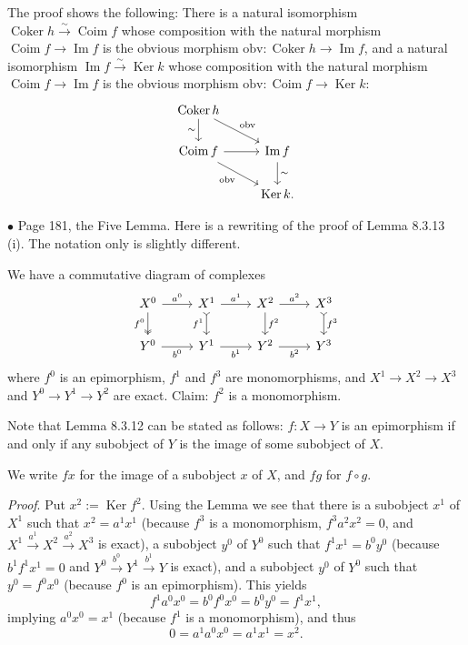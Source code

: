 \documentclass[12pt]{article}
\theoremstyle{remark}%
\newcommand{\bu}{\bullet}
\newcommand{\n}{\noindent}
\DeclareMathOperator{\Coim}{Coim}
\DeclareMathOperator{\Coker}{Coker}
\DeclareMathOperator{\Ima}{Im}
\DeclareMathOperator{\Ker}{Ker}
\begin{document}
The proof shows the following: There is a natural isomorphism $\Coker h\xrightarrow{\sim}\Coim f$ whose composition with the natural morphism $\Coim f\to\Ima f$ is the obvious morphism $\text{obv}:\Coker h\to\Ima f$, and a natural isomorphism $\Ima f\xrightarrow{\sim}\Ker k$ whose composition with the natural morphism $\Coim f\to\Ima f$ is the obvious morphism $\text{obv}:\Coim f\to\Ker k$: 
$$
\begin{tikzcd}
\Coker h\ar{d}[swap]{\sim}\ar{dr}{\text{obv}}\\
\Coim f\ar{r}\ar{dr}[swap]{\text{obv}}&\Ima f\ar{d}{\sim}\\
&\Ker k.
\end{tikzcd}
$$


\n$\bu$ Page 181, the Five Lemma. Here is a rewriting of the proof of Lemma 8.3.13 (i). The notation only is slightly different. 

We have a commutative diagram of complexes 
$$
\begin{tikzcd}
X^0\arrow[two heads]{d}[swap]{f^0}\arrow{r}{a^0}&
X^1\arrow[tail]{d}[swap]{f^1}\arrow{r}{a^1}&
X^2\arrow{d}{f^2}\arrow{r}{a^2}&
X^3\arrow[tail]{d}{f^3}\\ 
Y^0\arrow{r}[swap]{b^0}&
Y^1\arrow{r}[swap]{b^1}&
Y^2\arrow{r}[swap]{b^2}&
Y^3
\end{tikzcd}
$$
where $f^0$ is an epimorphism, $f^1$ and $f^3$ are monomorphisms, and $X^1\to X^2\to X^3$ and $Y^0\to Y^1\to Y^2$ are exact. Claim: $f^2$ is a monomorphism. 

Note that Lemma 8.3.12 can be stated as follows: $f:X\to Y$ is an epimorphism if and only if any subobject of $Y$ is the image of some subobject of $X$. 

We write $fx$ for the image of a subobject $x$ of $X$, and $fg$ for $f\circ g$.

\n\emph{Proof}. Put $x^2:=\Ker f^2$. Using the Lemma we see that there is a subobject $x^1$ of $X^1$ such that $x^2=a^1x^1$ (because $f^3$ is a monomorphism, $f^3a^2x^2=0$, and $X^1\overset{a^1}{\to}X^2\overset{a^2}{\to}X^3$ is exact), a subobject $y^0$ of $Y^0$ such that $f^1x^1=b^0y^0$ (because $b^1f^1x^1=0$ and $Y^0\overset{b^0}{\to}Y^1\overset{b^1}{\to}Y$ is exact), and a subobject $y^0$ of $Y^0$ such that $y^0=f^0x^0$ (because $f^0$ is an epimorphism). This yields  
$$
f^1a^0x^0=b^0f^0x^0=b^0y^0=f^1x^1,
$$
implying $a^0x^0=x^1$ (because $f^1$ is a monomorphism), and thus 
$$
0=a^1a^0x^0=a^1x^1=x^2.
$$ 

\end{document}
